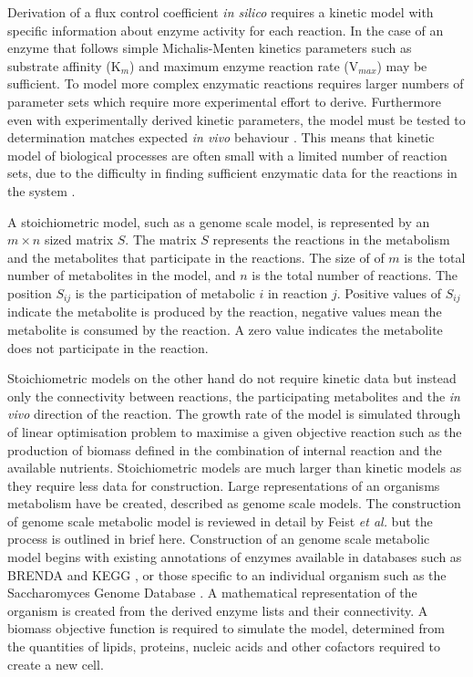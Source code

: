 Derivation of a flux control coefficient \emph{in silico} requires a kinetic model with specific information about enzyme activity for each reaction. In the case of an enzyme that follows simple Michalis-Menten kinetics parameters such as substrate affinity (K$_{m}$) and maximum enzyme reaction rate (V$_{max}$) may be sufficient. To model more complex enzymatic reactions requires larger numbers of parameter sets which require more experimental effort to derive. Furthermore even with experimentally derived kinetic parameters, the model must be tested to determination matches expected \emph{in vivo} behaviour \cite{teusink2000}. This means that kinetic model of biological processes are often small with a limited number of reaction sets, due to the difficulty in finding sufficient enzymatic data for the reactions in the system \cite{steuer2007}.


A stoichiometric model, such as a genome scale model, is represented by an $m \times n$ sized matrix $S$. The matrix $S$ represents the reactions in the metabolism and the metabolites that participate in the reactions. The size of of $m$ is the total number of metabolites in the model, and $n$ is the total number of reactions. The position $S_{ij}$ is the participation of metabolic $i$ in reaction $j$. Positive values of $S_{ij}$ indicate the metabolite is produced by the reaction, negative values mean the metabolite is consumed by the reaction. A zero value indicates the metabolite does not participate in the reaction.

Stoichiometric models on the other hand do not require kinetic data but instead only the connectivity between reactions, the participating metabolites and the \emph{in vivo} direction of the reaction. The growth rate of the model is simulated through of linear optimisation problem to maximise a given objective reaction such as the production of biomass defined in the combination of internal reaction and the available nutrients. Stoichiometric models are much larger than kinetic models as they require less data for construction. Large representations of an organisms metabolism have be created, described as genome scale models. The construction of genome scale metabolic model is reviewed in detail by Feist \emph{et al.} \cite{feist2009} but the process is outlined in brief here. Construction of an genome scale metabolic model begins with existing annotations of enzymes available in databases such as BRENDA \cite{chang2009} and KEGG \cite{okuda2008}, or those specific to an individual organism such as the Saccharomyces Genome Database \cite{cherry1997}. A mathematical representation of the organism is created from the derived enzyme lists and their connectivity. A biomass objective function is required to simulate the model, determined from the quantities of lipids, proteins, nucleic acids and other cofactors required to create a new cell.

